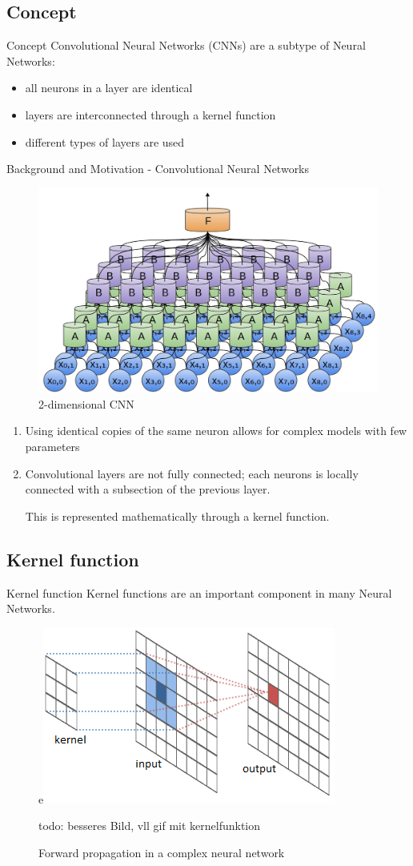 \documentclass[12pt]{beamer}
\begin{document}
\subsection{Concept}
\begin{frame}{Concept}
Convolutional Neural Networks (CNNs) are a subtype of Neural Networks:
  \begin{itemize}
     \item all neurons in a layer are identical 
     \item layers are interconnected through a kernel function
     \item different types of layers are used %
  \end{itemize}
\end{frame}
\begin{frame}{Background and Motivation - Convolutional Neural Networks}
\begin{figure}
\centering
\includegraphics[width = 0.4\linewidth]{images/convexample.jpg}
\caption{2-dimensional CNN}
\label{fig:principle}
\end{figure}
\begin{enumerate}
\item Using identical copies of the same neuron allows for complex models with few parameters
\item Convolutional layers are not fully connected; each neurons is locally connected with a subsection of the previous layer.

This is represented mathematically through a kernel function.
\end{enumerate}
\end{frame}
\subsection{Kernel function}

\begin{frame}{Kernel function}
Kernel functions are an important component in many Neural Networks.
 \begin{figure}
\centering
e\includegraphics[width = 0.4\linewidth]{images/kernelfunction.png}
\caption{Forward propagation in a complex neural network}
todo: besseres Bild, vll gif mit kernelfunktion



\label{fig:propagation}
\end{figure}


\end{frame}
\end{document}
